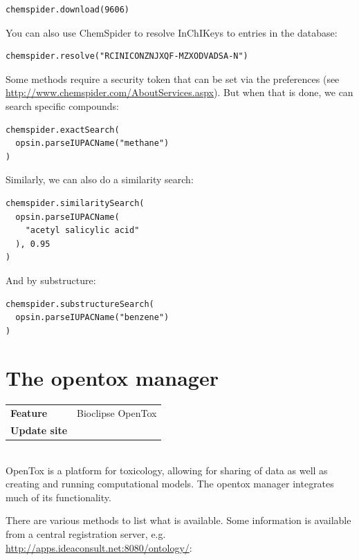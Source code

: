 \documentclass{book}
\begin{document}
\begin{refsection}
\begin{Verbatim}
chemspider.download(9606)
\end{Verbatim}

You can also use ChemSpider to resolve InChIKeys to entries
in the database:

\begin{Verbatim}
chemspider.resolve("RCINICONZNJXQF-MZXODVADSA-N")
\end{Verbatim}

Some methods require a security token that can be set via
the preferences (see
\url{http://www.chemspider.com/AboutServices.aspx}).
But when that is done, 
we can search specific compounds:

\begin{Verbatim}
chemspider.exactSearch(
  opsin.parseIUPACName("methane")
)
\end{Verbatim}

Similarly, we can also do a similarity search:

\begin{Verbatim}
chemspider.similaritySearch(
  opsin.parseIUPACName(
    "acetyl salicylic acid"
  ), 0.95
)
\end{Verbatim}

And by substructure:

\begin{Verbatim}
chemspider.substructureSearch(
  opsin.parseIUPACName("benzene")
)
\end{Verbatim}

\section{The opentox manager}

\begin{tabular}{ll}
\textbf{Feature} & Bioclipse OpenTox \\
\textbf{Update site} & \url{} \\
\end{tabular} \\

OpenTox is a platform for toxicology, allowing for sharing of data as well
as creating and running computational models\cite{hardy2010collaborative}.
The opentox manager integrates much of its
functionality\cite{willighagen2011computational}.

There are various methods to list what is available. Some information
is available from a central registration server, e.g.
\url{http://apps.ideaconsult.net:8080/ontology/}:


\end{refsection}
\end{document}
